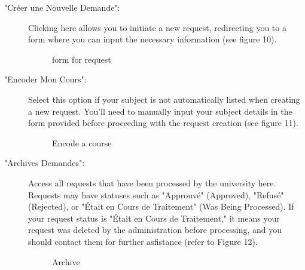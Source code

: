 \documentclass[12pt]{article}
\begin{document}
\begin{description}
\item["Créer une Nouvelle Demande":]Clicking here allows you to initiate a new request, redirecting you to a form where you can input the necessary information (see figure 10).
\begin{figure}[H]
    \centering
    \caption{form for request}
\end{figure}
\item["Encoder Mon Cours":] Select this option if your subject is not automatically listed when creating a new request. You'll need to manually input your subject details in the form provided  before proceeding with the request creation (see figure 11).
\begin{figure}[H]
    \centering
    \caption{Encode a course}
\end{figure}

\item["Archives Demandes":] Access all requests that have been processed by the university here. Requests may have statuses such as "Approuvé" (Approved), "Refusé" (Rejected), or "Était en Cours de Traitement" (Was Being Processed). If your request status is "Était en Cours de Traitement," it means your request was deleted by the administration before processing, and you should contact them for further asfistance (refer to Figure 12).
\begin{figure}[H]
    \centering
    \caption{Archive}
\end{figure}
\end{description}
\end{document}
